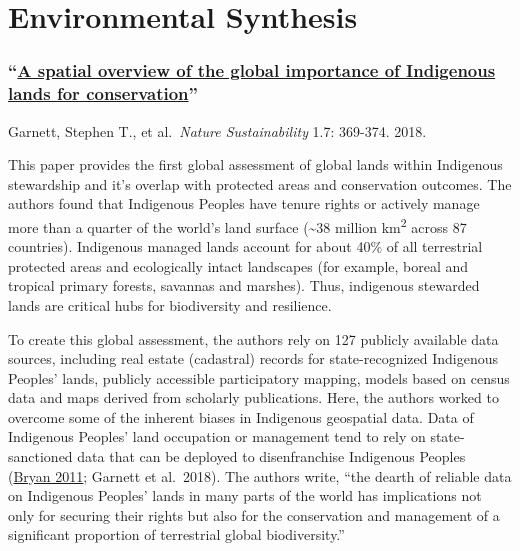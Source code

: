 \documentclass[
]{book}
\begin{document}
\hypertarget{environmental-synthesis}{%
\section{Environmental Synthesis}\label{environmental-synthesis}}

\hypertarget{a-spatial-overview-of-the-global-importance-of-indigenous-lands-for-conservation}{%
\subsubsection*{\texorpdfstring{``\href{https://www.nature.com/articles/s41893-018-0100-6?ss_source=sscampaigns\&ss_campaign_id=5c424fe9d20e280001eb02bf\&ss_email_id=5c5cf4c39bca21000175c9fd\&ss_campaign_name=Introducing+the+Interfaith+Rainforest+Initiative\&ss_campaign_sent_date=2019-02-08T03:17:24Z}{A spatial overview of the global importance of Indigenous lands for conservation}''}{``A spatial overview of the global importance of Indigenous lands for conservation''}}\label{a-spatial-overview-of-the-global-importance-of-indigenous-lands-for-conservation}}

Garnett, Stephen T., et al.~\emph{Nature Sustainability} 1.7: 369-374. 2018.

This paper provides the first global assessment of global lands within Indigenous stewardship and it's overlap with protected areas and conservation outcomes. The authors found that Indigenous Peoples have tenure rights or actively manage more than a quarter of the world's land surface (\textasciitilde38 million km\textsuperscript{2} across 87 countries). Indigenous managed lands account for about 40\% of all terrestrial protected areas and ecologically intact landscapes (for example, boreal and tropical primary forests, savannas and marshes). Thus, indigenous stewarded lands are critical hubs for biodiversity and resilience.

To create this global assessment, the authors rely on 127 publicly available data sources, including real estate (cadastral) records for state-recognized Indigenous Peoples' lands, publicly accessible participatory mapping, models based on census data and maps derived from scholarly publications. Here, the authors worked to overcome some of the inherent biases in Indigenous geospatial data. Data of Indigenous Peoples' land occupation or management tend to rely on state-sanctioned data that can be deployed to disenfranchise Indigenous Peoples (\href{https://www.sciencedirect.com/science/article/pii/S0016718510001090?via\%3Dihub}{Bryan 2011}; Garnett et al.~2018). The authors write, ``the dearth of reliable data on Indigenous Peoples' lands in many parts of the world has implications not only for securing their rights but also for the conservation and management of a significant proportion of terrestrial global biodiversity.''
\end{document}
